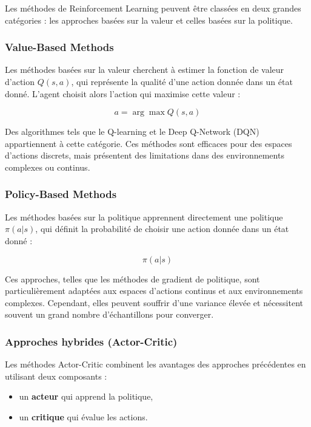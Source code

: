 \documentclass[12pt,a4paper]{report}
\begin{document}
Les méthodes de Reinforcement Learning peuvent être classées en deux grandes catégories : les approches basées sur la valeur et celles basées sur la politique.

\subsubsection{Value-Based Methods}

Les méthodes basées sur la valeur cherchent à estimer la fonction de valeur d’action $Q(s,a)$, qui représente la qualité d’une action donnée dans un état donné. L’agent choisit alors l’action qui maximise cette valeur :

\begin{equation}
a = \arg\max Q(s,a)
\end{equation}

Des algorithmes tels que le Q-learning et le Deep Q-Network (DQN) appartiennent à cette catégorie. Ces méthodes sont efficaces pour des espaces d’actions discrets, mais présentent des limitations dans des environnements complexes ou continus.

\subsubsection{Policy-Based Methods}

Les méthodes basées sur la politique apprennent directement une politique $\pi(a|s)$, qui définit la probabilité de choisir une action donnée dans un état donné :

\begin{equation}
\pi(a|s)
\end{equation}

Ces approches, telles que les méthodes de gradient de politique, sont particulièrement adaptées aux espaces d’actions continus et aux environnements complexes. Cependant, elles peuvent souffrir d’une variance élevée et nécessitent souvent un grand nombre d’échantillons pour converger.

\subsubsection{Approches hybrides (Actor-Critic)}

Les méthodes Actor-Critic combinent les avantages des approches précédentes en utilisant deux composants :
\begin{itemize}
    \item un \textbf{acteur} qui apprend la politique,
    \item un \textbf{critique} qui évalue les actions.
\end{itemize}
\end{document}
